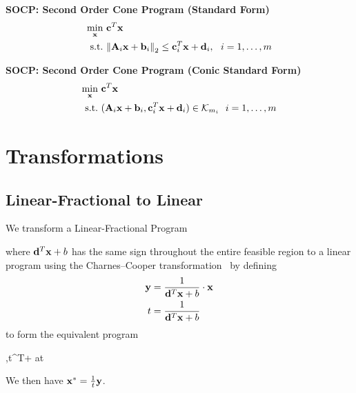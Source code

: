 \textbf{SOCP: Second Order Cone Program (Standard Form)}
\begin{align}
\min_{\mathbf{x}}      ~& \mathbf{c}^T \mathbf{x} \\
\textrm{s.t.}   ~& \norm{\mathbf{A}_i \mathbf{x}+\mathbf{b}_i}_2\le \mathbf{c}_i^T \mathbf{x}+\mathbf{d}_i,~~i=1,\ldots,m
\end{align}

\textbf{SOCP: Second Order Cone Program (Conic Standard Form)}
\begin{align}
\min_{\mathbf{x}}      ~& \mathbf{c}^T \mathbf{x} \\
\textrm{s.t.}   ~& (\mathbf{A}_i \mathbf{x}+\mathbf{b}_i, \mathbf{c}_i^T \mathbf{x}+\mathbf{d}_i)\in\mathcal{K}_{m_i} ~~i=1,\ldots,m
\end{align}

\section{Transformations}

\subsection{Linear-Fractional to Linear}
We transform a Linear-Fractional Program
\begin{maxi!}{\vx}{}{}{}
\addConstraint{\mA\vx}{\le \vb}
\end{maxi!}
where $\mathbf{d}^T \mathbf{x} + b$ has the same sign throughout the entire feasible region to a linear program using the Charnes--Cooper transformation~\citep{Charnes1962} by defining
\begin{align}
\mathbf{y} &= \frac{1}{\mathbf{d}^T\mathbf{x}+b}\cdot\mathbf{x} \\
t   &= \frac{1}{\mathbf{d}^T\mathbf{x}+b}
\end{align}
to form the equivalent program
\begin{maxi!}{\vy,t}{\vc^T\vy + at}{}{}
\end{maxi!}
We then have $\mathbf{x}^*=\frac{1}{t}\mathbf{y}$.